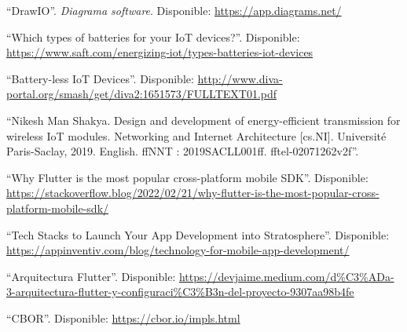 \begin{references}
    “DrawIO”. \textit{Diagrama software}. Disponible: \url{https://app.diagrams.net/}

    “Which types of batteries for your IoT devices?”. Disponible: \url{https://www.saft.com/energizing-iot/types-batteries-iot-devices}

    “Battery-less IoT Devices”. Disponible: \url{http://www.diva-portal.org/smash/get/diva2:1651573/FULLTEXT01.pdf}

    “Nikesh Man Shakya. Design and development of energy-efficient transmission for wireless IoT modules. Networking and Internet Architecture [cs.NI]. Université Paris-Saclay, 2019. English. ffNNT :
    2019SACLL001ff. fftel-02071262v2f”.

    “Why Flutter is the most popular cross-platform mobile SDK”. Disponible: \url{https://stackoverflow.blog/2022/02/21/why-flutter-is-the-most-popular-cross-platform-mobile-sdk/}

    “Tech Stacks to Launch Your App Development into Stratosphere”. Disponible: \url{https://appinventiv.com/blog/technology-for-mobile-app-development/}

    “Arquitectura Flutter”. Disponible: \url{https://devjaime.medium.com/d%C3%ADa-3-arquitectura-flutter-y-configuraci%C3%B3n-del-proyecto-9307aa98b4fe}

    “CBOR”. Disponible: \url{https://cbor.io/impls.html}

\end{references}
